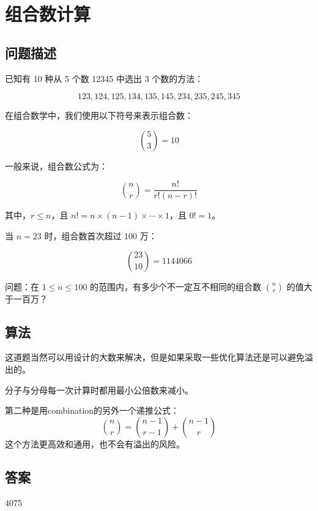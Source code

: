 \section{组合数计算}
\subsection{问题描述}
\begin{tcolorbox}
已知有 10 种从 5 个数 12345 中选出 3 个数的方法：

\[ 
123, 124, 125, 134, 135, 145, 234, 235, 245, 345 
\]

在组合数学中，我们使用以下符号来表示组合数：

\[
\binom{5}{3} = 10
\]

一般来说，组合数公式为：

\[
\binom{n}{r} = \frac{n!}{r!(n - r)!}
\]

其中，\(r \leq n\)，且 \(n! = n \times (n-1) \times \cdots \times 1\)，且 \(0! = 1\)。

当 \(n = 23\) 时，组合数首次超过 100 万：

\[
\binom{23}{10} = 1144066
\]

问题：在 \( 1 \leq n \leq 100 \) 的范围内，有多少个不一定互不相同的组合数 \( \binom{n}{r} \) 的值大于一百万？

\end{tcolorbox}

\subsection{算法}
这道题当然可以用设计的大数来解决，但是如果采取一些优化算法还是可以避免溢出的。

分子与分母每一次计算时都用最小公倍数来减小。

第二种是用combination的另外一个递推公式：
\begin{equation*}
\binom{n}{r}=\binom{n-1}{r-1}+\binom{n-1}{r}
\end{equation*}
这个方法更高效和通用，也不会有溢出的风险。
\subsection{答案}
4075
